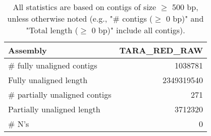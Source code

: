 \documentclass[12pt,a4paper]{article}
\begin{document}
\begin{table}[ht]
\begin{center}
\caption{All statistics are based on contigs of size $\geq$ 500 bp, unless otherwise noted (e.g., "\# contigs ($\geq$ 0 bp)" and "Total length ($\geq$ 0 bp)" include all contigs).}
\begin{tabular}{|l*{1}{|r}|}
\hline
Assembly & TARA\_RED\_RAW \\ \hline
\# fully unaligned contigs & 1038781 \\ \hline
Fully unaligned length & 2349319540 \\ \hline
\# partially unaligned contigs & 271 \\ \hline
Partially unaligned length & 3712320 \\ \hline
\# N's & 0 \\ \hline
\end{tabular}
\end{center}
\end{table}
\end{document}
